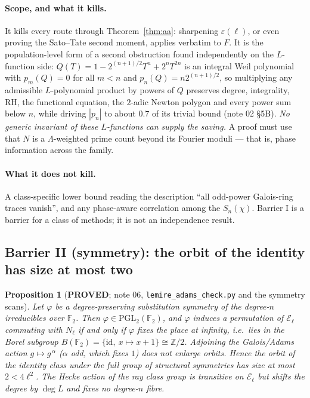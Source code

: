 \documentclass[10pt]{article}
\theoremstyle{plain}
\newtheorem{proposition}[theorem]{Proposition}
\theoremstyle{definition}
\newcommand{\F}{\mathbb F}
\newcommand{\Z}{\mathbb Z}
\newcommand{\E}{\mathcal E}
\newcommand{\Lam}{\Lambda}
\newcommand{\proved}{\textcolor{proved}{\textsf{\textbf{\footnotesize PROVED}}}}
\begin{document}
\paragraph{Scope, and what it kills.} It kills every route through
Theorem~\ref{thm:aa}: sharpening $\varepsilon(\ell)$, or even proving the
Sato--Tate second moment, applies verbatim to $F$. It is the population-level
form of a second obstruction found independently on the $L$-function side:
$Q(T)=1-2^{(n+1)/2}T^n+2^nT^{2n}$ is an integral Weil polynomial with
$p_m(Q)=0$ for all $m<n$ and $p_n(Q)=n2^{(n+1)/2}$, so multiplying any
admissible $L$-polynomial product by powers of $Q$ preserves degree,
integrality, RH, the functional equation, the $2$-adic Newton polygon and every
power sum below $n$, while driving $|p_n|$ to about $0.7$ of its trivial bound
(note 02 \S5B). \emph{No generic invariant of these $L$-functions can supply the
saving.} A proof must use that $N$ is a $\Lam$-weighted prime count beyond its
Fourier moduli --- that is, phase information across the family.

\paragraph{What it does not kill.} A class-specific lower bound reading the
description ``all odd-power Galois-ring traces vanish'', and any phase-aware
correlation among the $S_n(\chi)$. Barrier I is a barrier for a class of
methods; it is not an independence result.

\subsection{Barrier II (symmetry): the orbit of the identity has size at most two}

\begin{proposition}[\proved; note 06, \texttt{lemire\_adams\_check.py} and the
symmetry scans]\label{prop:bar2}
Let $\varphi$ be a degree-preserving substitution symmetry of the degree-$n$
irreducibles over $\F_2$. Then $\varphi\in \mathrm{PGL}_2(\F_2)$, and $\varphi$
induces a permutation of $\E_\ell$ commuting with $N_\ell$ if and only if
$\varphi$ fixes the place at infinity, i.e.\ lies in the Borel subgroup
$B(\F_2)=\{\mathrm{id},\ x\mapsto x+1\}\cong\Z/2$. Adjoining the Galois/Adams
action $g\mapsto g^{\,\alpha}$ ($\alpha$ odd, which fixes $1$) does not enlarge
orbits. Hence the orbit of the identity class under the full group of
structural symmetries has size at most $2<4\ell^2$. The Hecke action of the ray
class group is transitive on $\E_\ell$ but shifts the degree by $\deg L$ and
fixes no degree-$n$ fibre.
\end{proposition}
\end{document}
